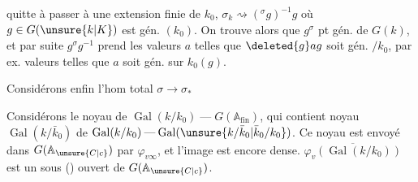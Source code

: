 quitte à passer à une extension finie de $k_0$, $\sigma_k\rightsquigarrow({}^\sigma g)^{-1}g$  où $g\in G(\unsure{k|K})$ est gén. $(k_0)$.
On trouve alors que $g^\sigma$ \uline{} pt gén. de $G(k)$, et par suite $g^\sigma g^{-1}$ prend   les valeurs $a$ telles que $\deleted{g}ag$ soit gén. $/k_0$, par ex.  valeurs telles que   $a$ soit gén. sur $k_0(g)$.

 Considérons enfin l'hom total $\sigma\longrightarrow\sigma_*$

Considérons le noyau de $\operatorname{Gal}(k/k_0)\mathbin{\text{---}}G(\mathbb A_{\mathrm{fin}})$, qui contient  noyau $\operatorname{Gal}(k/\bar k_0)$ de $\operatorname{Gal}(k/k_0)\mathbin{\text{---}}\operatorname{Gal}(\unsure{k/\bar k_0|\bar k_0/k_0})$. Ce noyau est envoyé dans $G(\mathbb A_{\unsure{C|c}})$ par $\varphi_{v\infty}$, et l'image est encore dense.     $\overline{\varphi_v(\operatorname{Gal}(k/k_0))}$ est un sous () ouvert de $G(\mathbb A_{\unsure{C|c}})$.
